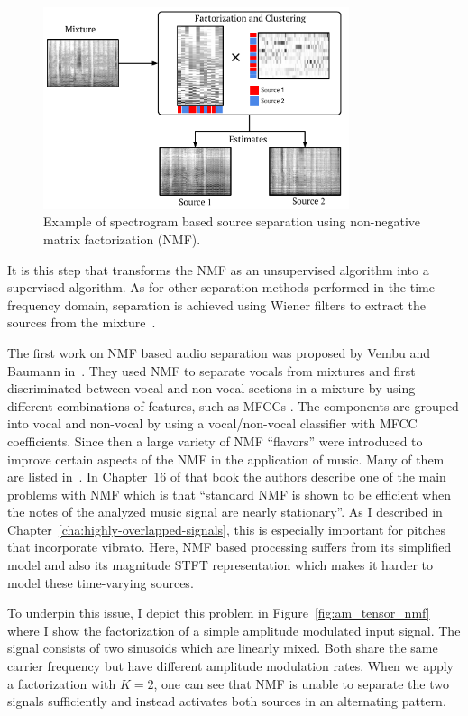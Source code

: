 \begin{figure}
  \centering
  \includegraphics[width=0.8\textwidth]{Chapters/06_Separation_Unknown/figures/nmf_separation.pdf}
  \caption{Example of spectrogram based source separation using non-negative matrix factorization (NMF).}
  \label{fig:nmf_separation}
\end{figure}

It is this step that transforms the NMF as an unsupervised algorithm into a supervised algorithm.
As for other separation methods performed in the time-frequency domain, separation is achieved using Wiener filters to extract the sources from the mixture~\cite{liutkus15c}.
\par
The first work on NMF based audio separation was proposed by Vembu and Baumann in~\cite{vembu05}. 
They used NMF to separate vocals from mixtures and first discriminated between vocal and non-vocal sections in a mixture by using different combinations of features, such as MFCCs \cite{david80}. 
The components are grouped into vocal and non-vocal by using a vocal/non-vocal classifier with MFCC coefficients.
Since then a large variety of NMF ``flavors'' were introduced to improve certain aspects of the NMF in the application of music. 
Many of them are listed in~\cite{vincent}.
In Chapter~16 of that book the authors describe one of the main problems with NMF which is that ``standard NMF is shown to be efficient when the notes of the analyzed music signal are nearly stationary''.
As I described in Chapter~\ref{cha:highly-overlapped-signals}, this is especially important for pitches that incorporate vibrato.
Here, NMF based processing suffers from its simplified model and also its magnitude STFT representation which makes it harder to model these time-varying sources.
\par
To underpin this issue, I depict this problem in Figure~\ref{fig:am_tensor_nmf} where I show the factorization of a simple amplitude modulated input signal. 
The signal consists of two sinusoids which are linearly mixed. 
Both share the same carrier frequency but have different amplitude modulation rates. 
When we apply a factorization with $K=2$, one can see that NMF is unable to separate the two signals sufficiently and instead activates both sources in an alternating pattern.

